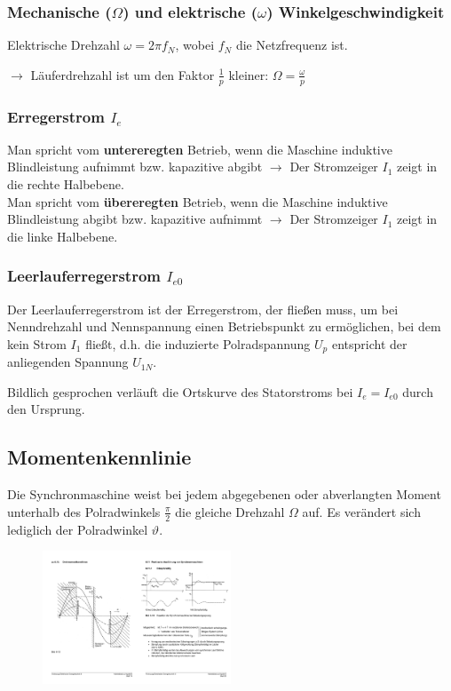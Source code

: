 \documentclass[a4paper, 11pt]{article}
\begin{document}
\subsubsection*{Mechanische ($\Omega$) und elektrische ($\omega$) Winkelgeschwindigkeit}
Elektrische Drehzahl $\omega = 2 \pi f_N$, wobei $f_N$ die Netzfrequenz ist.

\vspace{.5em}
$\rightarrow$ Läuferdrehzahl ist um den Faktor $\frac{1}{p}$ kleiner: $\Omega=\frac{\omega}{p}$\\

\subsubsection*{Erregerstrom $I_e$}
Man spricht vom \textbf{untereregten} Betrieb, wenn die Maschine induktive Blindleistung aufnimmt bzw. kapazitive abgibt $\rightarrow$ Der Stromzeiger $I_1$ zeigt in die rechte Halbebene.\\
Man spricht vom \textbf{übereregten} Betrieb, wenn die Maschine induktive Blindleistung abgibt bzw. kapazitive aufnimmt $\rightarrow$ Der Stromzeiger $I_1$ zeigt in die linke Halbebene.\\

\subsubsection*{Leerlauferregerstrom $I_{e0}$}
Der Leerlauferregerstrom ist der Erregerstrom, der fließen muss, um bei Nenndrehzahl und Nennspannung einen Betriebspunkt zu ermöglichen, bei dem kein Strom $I_1$ fließt, d.h. die induzierte Polradspannung $U_p$ entspricht der anliegenden Spannung $U_{1N}$.

\vspace{0.5em}
Bildlich gesprochen verläuft die Ortskurve des Statorstroms bei $I_e = I_{e0}$ durch den Ursprung.

\subsection*{Momentenkennlinie}
Die Synchronmaschine weist bei jedem abgegebenen oder abverlangten Moment unterhalb des Polradwinkels $\frac{\pi}{2}$ die gleiche Drehzahl $\Omega$ auf. Es verändert sich lediglich der Polradwinkel $\vartheta$.

\begin{figure}[H]
	\centering
	\includegraphics[width=0.5\textwidth]{img/SM_Kennlinie.pdf}
\end{figure}
\end{document}
